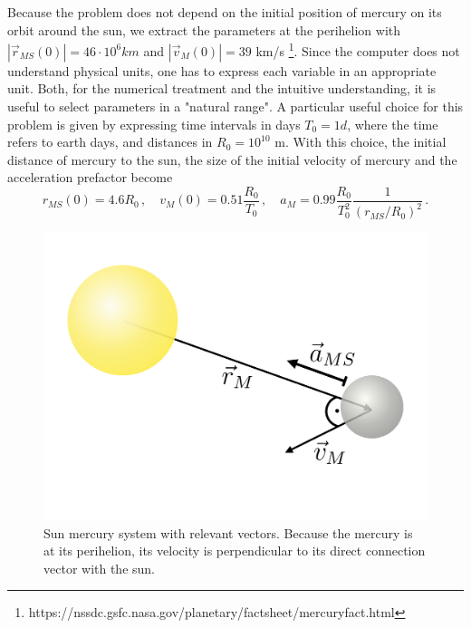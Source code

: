 \documentclass[12pt]{iopart}
\newcommand{\abs}[1]{\left\vert #1 \right\vert}
\begin{document}
Because the problem does not depend on the initial position of mercury on its orbit around the sun, we extract the parameters at the perihelion with $ \abs{\vec r_{MS}(0)} = 46 \cdot 10^6 km$ and $ \abs{\vec v_M(0)} = 39$ km/s \footnote{https://nssdc.gsfc.nasa.gov/planetary/factsheet/mercuryfact.html}.  Since the computer does not understand physical units, one has to express each variable in an appropriate unit.  Both, for the numerical treatment and the intuitive understanding, it is useful to select parameters in a "natural range".  A particular useful choice for this problem is given by expressing time intervals in days $T_0 = 1d$, where the time refers to earth days, and distances in $R_0 = 10^{10}$ m.  With this choice, the initial distance of mercury to the sun, the size of the initial velocity of mercury and the acceleration prefactor become
\begin{equation}
	r_{MS}(0) = 4.6 R_0 \, , \quad
	v_{M}(0)  = 0.51 \frac{R_0}{T_0} \, ,  \quad
	a_M       = 0.99 \frac{R_0}{T_0^2} \frac{1}{\left(r_{MS}/R_0\right)^2}
	\, .
\end{equation}

\begin{figure}[htb]
	\centering
	\includegraphics[width=.4\textwidth]{figs/sun_merc.pdf}
	\caption{\label{fig:sun_merc}Sun mercury system with relevant vectors.  Because the mercury is at its perihelion, its velocity is perpendicular to its direct connection vector with the sun.}
\end{figure}
\end{document}
